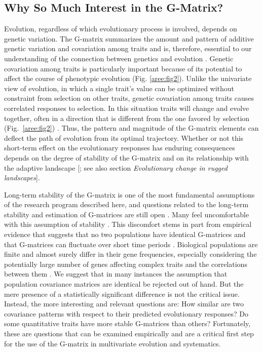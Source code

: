 \begin{refsection}
\subsection{Why So Much Interest in the G-Matrix?}

\enlargethispage{\baselineskip}
Evolution, regardless of which evolutionary process is involved, depends
on genetic variation. The G-matrix summarizes the amount and pattern of
additive genetic variation and covariation among traits and is,
therefore, essential to our understanding of the connection between
genetics and evolution \parencite{Lande1979-by}.
Genetic covariation among traits is particularly important because of
its potential to affect the course of phenotypic evolution
(Fig. \ref{aree:fig2}). Unlike the univariate
view of evolution, in which a single trait's value can be optimized
without constraint from selection on other traits, genetic covariation
among traits causes correlated responses to selection. In this situation
traits will change and evolve together, often in a direction that is
different from the one favored by selection
(Fig.~\ref{aree:fig2})
\parencite{Lande1979-by, Grant1995-er}. Thus, the pattern and
magnitude of the G-matrix elements can deflect the path of evolution
from its optimal trajectory. Whether or not this short-term effect on
the evolutionary responses has enduring consequences depends on the
degree of stability of the G-matrix and on its relationship with the
adaptive landscape [\textcite{Steppan2002-be}; see also section \emph{Evolutionary change in rugged
landscapes}].

Long-term stability of the G-matrix is one of the most fundamental
assumptions of the research program described here, and questions
related to the long-term stability and estimation of G-matrices are
still open \parencite{Houle2015-jb, Jones2012-aq}. Many feel
uncomfortable with this assumption of stability \parencite{Bjorklund2013-io}. This
discomfort stems in part from empirical evidence that suggests that no
two populations have identical G-matrices and that G-matrices can
fluctuate over short time periods \parencite{Bjorklund2013-io, Eroukhmanoff2011-ph}.
Biological populations are finite and almost surely differ in their gene
frequencies, especially considering the potentially large number of
genes affecting complex traits and the correlations between them \parencite{Phillips2001-xb, Whitlock2002-yb}. 
We suggest that in many instances the assumption that population covariance
matrices are identical be rejected out of hand. But the mere presence of
a statistically significant difference is not the critical issue.
Instead, the more interesting and relevant questions are: How similar
are two covariance patterns with respect to their predicted evolutionary
responses? Do some quantitative traits have more stable G-matrices than
others? Fortunately, these are questions that can be examined
empirically \parencite{Calsbeek2009-fl, Cheverud2007-yp} and
are a critical first step for the use of the G-matrix in multivariate
evolution and systematics.


\end{refsection}
